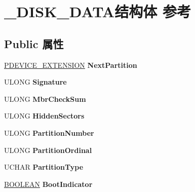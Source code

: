 \hypertarget{struct___d_i_s_k___d_a_t_a}{}\section{\+\_\+\+D\+I\+S\+K\+\_\+\+D\+A\+T\+A结构体 参考}
\label{struct___d_i_s_k___d_a_t_a}
\subsection*{Public 属性}
\begin{DoxyCompactItemize}
\item 
\mbox{\label{struct___d_i_s_k___d_a_t_a_a620fb1a8ece5acc5de288a4e92ad65c6}} 
\hyperlink{struct___b_e_e_p___d_e_v_i_c_e___e_x_t_e_n_s_i_o_n}{P\+D\+E\+V\+I\+C\+E\+\_\+\+E\+X\+T\+E\+N\+S\+I\+ON} {\bfseries Next\+Partition}
\item 
\mbox{\label{struct___d_i_s_k___d_a_t_a_a36ab659e988ca4afa007c1732e1bd2d1}} 
U\+L\+O\+NG {\bfseries Signature}
\item 
\mbox{\label{struct___d_i_s_k___d_a_t_a_a78d3ea13a6ed73c9885df8af281d5cb0}} 
U\+L\+O\+NG {\bfseries Mbr\+Check\+Sum}
\item 
\mbox{\label{struct___d_i_s_k___d_a_t_a_a7bc75fc21c3573d86b89ec9dcaf738be}} 
U\+L\+O\+NG {\bfseries Hidden\+Sectors}
\item 
\mbox{\label{struct___d_i_s_k___d_a_t_a_a8336908355ea67466c7271e799c328ce}} 
U\+L\+O\+NG {\bfseries Partition\+Number}
\item 
\mbox{\label{struct___d_i_s_k___d_a_t_a_a3fe3ad3e6ea801d81868e4d3f8e7c579}} 
U\+L\+O\+NG {\bfseries Partition\+Ordinal}
\item 
\mbox{\label{struct___d_i_s_k___d_a_t_a_a7334e85c2d24268b86ee02f0bba60a71}} 
U\+C\+H\+AR {\bfseries Partition\+Type}
\item 
\mbox{\label{struct___d_i_s_k___d_a_t_a_a7eb4e2a26bfd90f228adb3d8c991f959}} 
\hyperlink{_processor_bind_8h_a112e3146cb38b6ee95e64d85842e380a}{B\+O\+O\+L\+E\+AN} {\bfseries Boot\+Indicator}

\end{DoxyCompactItemize}
